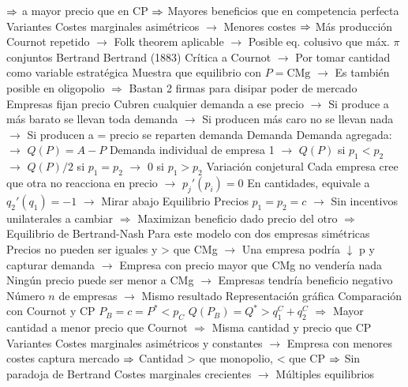 \documentclass{nuevotema}
\begin{document}
\begin{esquemal}
				\4[] $\Rightarrow$ a mayor precio que en CP
				\4[] $\Rightarrow$ Mayores beneficios que en competencia perfecta
				\4 Variantes
				\4[] Costes marginales asimétricos
				\4[] $\to$ Menores costes $\Rightarrow$ Más producción
				\4[] Cournot repetido
				\4[] $\to$ Folk theorem aplicable
				\4[] $\to$ Posible eq. colusivo que máx. $\pi$ conjuntos
			\3 Bertrand
				\4 Bertrand (1883)
				\4[] Crítica a Cournot
				\4[] $\to$ Por tomar cantidad como variable estratégica
				\4[] Muestra que equilibrio con $P=\text{CMg}$
				\4[] $\to$ Es también posible en oligopolio
				\4[] $\Rightarrow$ Bastan 2 firmas para disipar poder de mercado
				\4 Empresas fijan precio
				\4[] Cubren cualquier demanda a ese precio
				\4[] $\to$ Si produce a más barato se llevan toda demanda
				\4[] $\to$ Si producen más caro no se llevan nada
				\4[] $\to$ Si producen a = precio se reparten demanda
				\4 Demanda
				\4[] Demanda agregada:
				\4[] $\to$ $Q(P) = A - P$
				\4[] Demanda individual de empresa 1
				\4[] $\to$ $Q(P)$ si $p_1 < p_2$
				\4[] $\to$ $Q(P)/2$ si $p_1 = p_2$
				\4[] $\to$ $0$ si $p_1 > p_2$
				\4 Variación conjetural
				\4[] Cada empresa cree que otra no reacciona en precio
				\4[] $\to$ $p_j'(p_i) = 0$
				\4[] En cantidades, equivale a $q_2'(q_1) = -1$
				\4[] $\to$ Mirar abajo
				\4 Equilibrio
				\4[] Precios $p_1 = p_2 = c$
				\4[] $\to$ Sin incentivos unilaterales a cambiar
				\4[] $\Rightarrow$ Maximizan beneficio dado precio del otro
				\4[] $\Rightarrow$ Equilibrio de Bertrand-Nash
				\4[] Para este modelo con dos empresas simétricas
				\4[] 
				\4[] 
				\4[] 
				\4[] Precios no pueden ser iguales y > que CMg
				\4[] $\to$ Una empresa podría $\downarrow$ p y capturar demanda
				\4[] $\to$ Empresa con precio mayor que CMg no vendería nada
				\4[] Ningún precio puede ser menor a CMg
				\4[] $\to$ Empresas tendría beneficio negativo
				\4[] Número $n$ de empresas
				\4[] $\to$ Mismo resultado
				\4 Representación gráfica
				\4[] 
				\4 Comparación con Cournot y CP
				\4[] $P_B = c = P^* < p_C$
				\4[] $Q(P_B) = Q^* > q_1^C + q_2^C $
				\4[] $\Rightarrow$ Mayor cantidad a menor precio que Cournot
				\4[] $\Rightarrow$ Misma cantidad y precio que CP
				\4 Variantes
				\4[] Costes marginales asimétricos y constantes
				\4[] $\to$ Empresa con menores costes captura mercado
				\4[] $\Rightarrow$ Cantidad > que monopolio, < que CP
				\4[] $\Rightarrow$ Sin paradoja de Bertrand
				\4[] Costes marginales crecientes
				\4[] $\to$ Múltiples equilibrios

\end{esquemal}
\end{document}
